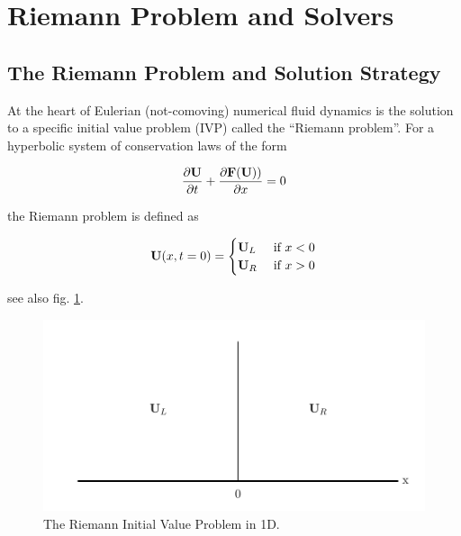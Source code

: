 \newpage


\section{Riemann Problem and Solvers} \label{chap:riemann}





\subsection{The Riemann Problem and Solution Strategy}




At the heart of Eulerian (not-comoving) numerical fluid dynamics is the solution to a specific initial value problem (IVP) called the ``Riemann problem''.
For a hyperbolic system of conservation laws of the form

\begin{align}
	\frac{\partial \mathbf{U}}{\partial t} + \frac{\partial \mathbf{F}(\mathbf{U}))}{\partial x} = 0
\end{align}

the Riemann problem is defined as

\begin{align}
	\mathbf{U}(x, t=0) = 
		\begin{cases}
			\mathbf{U}_L & \text{ if } x < 0\\
			\mathbf{U}_R & \text{ if } x > 0\\
		\end{cases}
\end{align}

see also fig. \ref{fig:riemann-problem}.

\begin{figure}[H]
	\includegraphics{./figures/riemann_problem.pdf}%
	\caption{
		The Riemann Initial Value Problem in 1D.
		\label{fig:riemann-problem}
	}
\end{figure}





